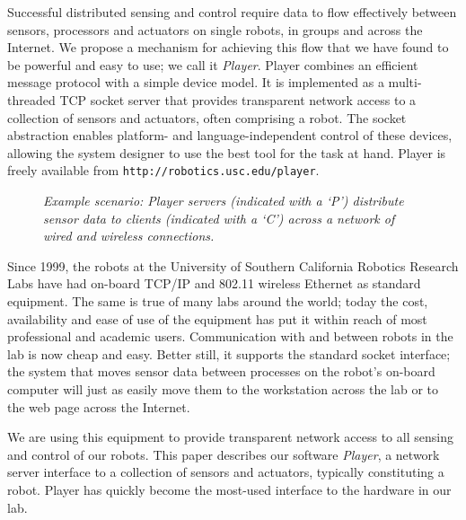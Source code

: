 \begin{Abstract}
\vspace*{-1em}
Successful distributed sensing and control require data to
flow effectively between sensors, processors and actuators on single
robots, in groups and across the Internet. We propose a mechanism for
achieving this flow that we have found to be powerful and easy to use; we
call it {\sl Player}.  Player combines an efficient message protocol
with a simple device model.  It is implemented as a multi-threaded TCP
socket server that provides transparent network access to a collection
of sensors and actuators, often comprising a robot.  The socket
abstraction enables platform- and language-independent control of these
devices, allowing the system designer to use the best tool for the
task at hand.  Player is freely available from
\verb+http://robotics.usc.edu/player+.
\end{Abstract}



\label{intro}

\begin{figure*}
\begin{center} 
 \caption{{\sl Example scenario: Player servers (indicated with a `P') 
     distribute sensor data to clients (indicated with a `C')
     across a network of wired and wireless connections.
     \label{fig:scenario}}}
\end{center}
\end{figure*}

Since 1999, the robots at the University of Southern California
Robotics Research Labs have had on-board TCP/IP and 802.11 wireless
Ethernet as standard equipment. The same is true of many labs around
the world; today the cost, availability and ease of use of the
equipment has put it within reach of most professional and academic users.
Communication with and between robots in the lab is now cheap and
easy. Better still, it supports the standard socket interface; the
system that moves sensor data between processes on the robot's
on-board computer will just as easily move them to the workstation
across the lab or to the web page across the Internet.

We are using this equipment to provide transparent network access to
all sensing and control of our robots. This paper describes our
software {\em Player}, a network server interface to a collection of
sensors and actuators, typically constituting a robot. Player has
quickly become the most-used interface to the hardware in our lab.

